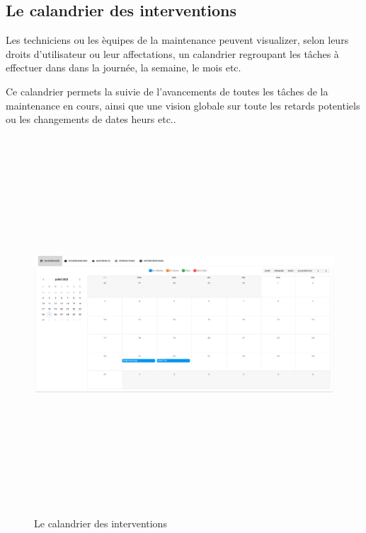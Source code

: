 \subsection{Le calandrier des interventions}
Les techniciens ou les èquipes de la maintenance peuvent visualizer, selon leurs droits d'utilisateur
ou leur affectations, un calandrier regroupant les tâches à effectuer dans dans la journée, la semaine, le mois etc.

Ce calandrier permets la suivie de l'avancements de toutes les tâches de la maintenance en cours,
ainsi que une vision globale sur toute les retards potentiels ou les changements de dates heurs etc..
\begin{figure}[hp]
    \centering
    \includegraphics[width=450pt, height=400pt]{images/dashboard.png}
    \caption{Le calandrier des interventions}
\end{figure}
\pagebreak